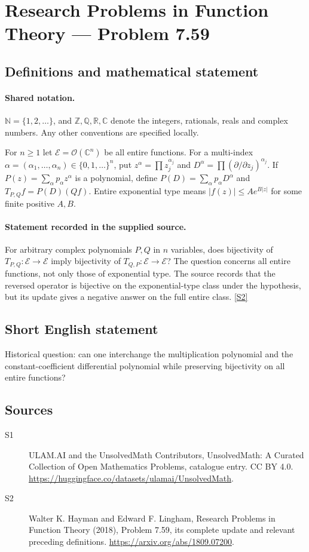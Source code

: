 \documentclass[11pt]{article}
\newcommand{\sref}[2]{\hyperlink{source:#1:#2}{[S#2]}}
\begin{document}
\section{Research Problems in Function Theory — Problem 7.59}\label{statement}

\subsection{Definitions and mathematical statement}

\paragraph{Shared notation.}$\mathbb N=\{1,2,\ldots\}$, and $\mathbb Z,\mathbb Q,\mathbb R,\mathbb C$ denote the integers, rationals, reals and complex numbers. Any other conventions are specified locally.


For $n\ge1$ let $\mathcal E=\mathcal O(\mathbb C^n)$ be all entire functions. For a multi-index $\alpha=(\alpha_1,\ldots,\alpha_n)\in\{0,1,\ldots\}^n$, put $z^\alpha=\prod z_j^{\alpha_j}$ and $D^\alpha=\prod(\partial/\partial z_j)^{\alpha_j}$. If $P(z)=\sum_\alpha p_\alpha z^\alpha$ is a polynomial, define $P(D)=\sum_\alpha p_\alpha D^\alpha$ and $T_{P,Q}f=P(D)(Qf)$. Entire exponential type means $|f(z)|\le A e^{B|z|}$ for some finite positive $A,B$.
\paragraph{Statement recorded in the supplied source.}
For arbitrary complex polynomials $P,Q$ in $n$ variables, does bijectivity of $T_{P,Q}:\mathcal E\to\mathcal E$ imply bijectivity of $T_{Q,P}:\mathcal E\to\mathcal E$? The question concerns all entire functions, not only those of exponential type. The source records that the reversed operator is bijective on the exponential-type class under the hypothesis, but its update gives a negative answer on the full entire class. \sref{statement}{2}
\subsection{Short English statement}
Historical question: can one interchange the multiplication polynomial and the constant-coefficient differential polynomial while preserving bijectivity on all entire functions?
\subsection{Sources}
\begin{description}
\item[\hypertarget{source:statement:1}{S1}] ULAM.AI and the UnsolvedMath Contributors, UnsolvedMath: A Curated Collection of Open Mathematics Problems, catalogue entry. CC BY 4.0. \url{https://huggingface.co/datasets/ulamai/UnsolvedMath}.
\item[\hypertarget{source:statement:2}{S2}] Walter K. Hayman and Edward F. Lingham, Research Problems in Function Theory (2018), Problem 7.59, its complete update and relevant preceding definitions. \url{https://arxiv.org/abs/1809.07200}.
\end{description}
\label{end:statement}
\end{document}
